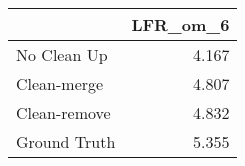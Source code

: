 \begin{tabular}{lr}
\toprule
{} & LFR_om_6 \\
\midrule
No Clean Up  &    4.167 \\
Clean-merge  &    4.807 \\
Clean-remove &    4.832 \\
Ground Truth &    5.355 \\
\bottomrule
\end{tabular}
